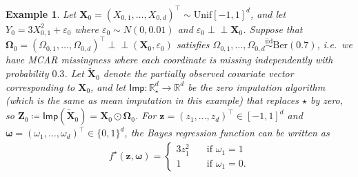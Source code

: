 \documentclass[12pt]{article}
\newcommand{\indep}{\perp\!\!\!\perp}
\newtheorem{example}{Example}
\def\tilde{\widetilde}
\begin{document}
\begin{example} \label{example:f-star}
Let $\bm{X}_0=(X_{0,1},\ldots,X_{0,d})^\top \sim \mathrm{Unif}[-1,1]^d$, and let $Y_0 = 3X_{0,1}^2 + \varepsilon_0$ where $\varepsilon_0 \sim N(0,0.01)$ and $\varepsilon_0 \indep \bm{X}_0$. Suppose that $\bm{\Omega}_0 = (\Omega_{0,1},\ldots,\Omega_{0,d})^\top \indep (\bm{X}_0,\varepsilon_0)$ satisfies $\Omega_{0,1},\ldots,\Omega_{0,d} \overset{\mathrm{iid}}{\sim} \mathrm{Ber}(0.7)$, i.e.~we have MCAR missingness where each coordinate is missing independently with probability $0.3$. Let $\tilde{\bm X}_0$ denote the partially observed covariate vector corresponding to $\bm{X}_0$, and let $\mathsf{Imp}:\mathbb{R}_{\star}^d \to \mathbb{R}^d$ be the zero imputation algorithm (which is the same as mean imputation in this example) that replaces $\star$ by zero, so $\bm Z_0 \coloneqq \mathsf{Imp}(\tilde{\bm X}_0) = \bm X_0 \odot \bm\Omega_0$. For $\bm{z} = (z_1,\ldots,z_d)^\top \in [-1,1]^d$ and $\bm{\omega} = (\omega_1,\ldots,\omega_d)^\top \in \{0,1\}^d$, the Bayes regression function can be written as
\begin{align*}
    f^{\star}(\bm{z}, \bm{\omega}) = \begin{cases}
        3z_1^2 \quad&\text{if } \omega_1 = 1\\
        1 &\text{if } \omega_1 = 0.
    \end{cases}
\end{align*}
\end{example}
\end{document}
